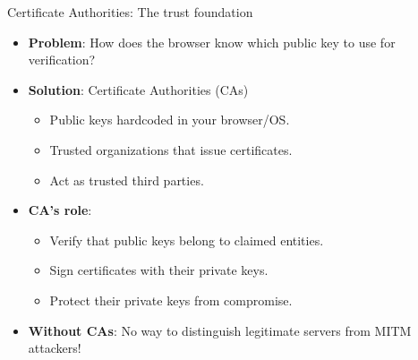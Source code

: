 \documentclass[aspectratio=169, lualatex, handout]{beamer}
\begin{document}
\begin{frame}{Certificate Authorities: The trust foundation}
	\begin{itemize}[<+->]
		\item \textbf{Problem}: How does the browser know which public key to use for verification?
		\item \textbf{Solution}: Certificate Authorities (CAs)
		      \begin{itemize}
			      \item Public keys hardcoded in your browser/OS.
			      \item Trusted organizations that issue certificates.
			      \item Act as trusted third parties.
		      \end{itemize}
		\item \textbf{CA's role}:
		      \begin{itemize}
			      \item Verify that public keys belong to claimed entities.
			      \item Sign certificates with their private keys.
			      \item Protect their private keys from compromise.
		      \end{itemize}
		\item \textbf{Without CAs}: No way to distinguish legitimate servers from MITM attackers!
	\end{itemize}
\end{frame}
\end{document}
